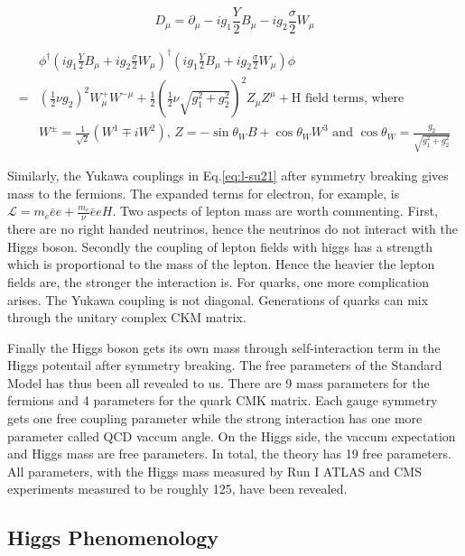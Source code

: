 \begin{equation}
 D_{\mu}  = \partial_{\mu}-ig_1\frac{Y}{2}B_{\mu} - ig_2\frac{\sigma}{2}W_{\mu}
  \label{eq:SU2U1D}
\end{equation}


\begin{equation}
  \begin{split}
   &\phi^{\dagger}(ig_1\frac{Y}{2}B_{\mu}+ig_2\frac{\sigma}{2}W_{\mu})^{\dagger} (ig_1\frac{Y}{2}B_{\mu}+ig_2\frac{\sigma}{2}W_{\mu}) \phi  \\
   =& (\frac{1}{2}\nu g_2)^2 W_{\mu}^+W^{-\mu} + \frac{1}{2}(\frac{1}{2}\nu \sqrt{g_1^2+g_2^2})^2 Z_{\mu}Z^{\mu} + \text{H field terms, where}\\
   &W^{\pm} = \frac{1}{\sqrt{2}}(W^1\mp iW^2) \text{, } Z = -\sin{\theta_W}B+\cos{\theta_W}W^3 \text{ and } \cos{\theta_W} = \frac{g_2}{\sqrt{g^2_1+g^2_2}}
  \end{split}
  \label{eq:SU2U1cov}
\end{equation}


Similarly, the Yukawa couplings in Eq.\ref{eq:l-su21} after symmetry breaking gives mass to the fermions. The expanded terms for electron, for example, is $\mathcal{L} = m_e\bar{e} e + \frac{m_{e}}{\nu}\bar{e}e H$. Two aspects of lepton mass are worth commenting. First, there are no right handed neutrinos, hence the neutrinos do not interact with the Higgs boson. Secondly the coupling of lepton fields with higgs has a strength which is proportional to the mass of the lepton. Hence the heavier the lepton fields are, the stronger the interaction is. For quarks, one more complication arises. The Yukawa coupling is not diagonal. Generations of quarks can mix through the unitary complex CKM matrix.

Finally the Higgs boson gets its own mass through self-interaction term in the Higgs potentail after symmetry breaking. The free parameters of the Standard Model has thus been all revealed to us. There are 9 mass parameters for the fermions and 4 parameters for the quark CMK matrix. Each gauge symmetry gets one free coupling parameter while the strong interaction has one more parameter called QCD vaccum angle. On the Higgs side, the vaccum expectation and Higgs mass are free parameters. In total, the theory has 19 free parameters. All parameters, with the Higgs mass measured by Run I ATLAS and CMS experiments measured to be roughly 125, have been revealed. 


\subsection{Higgs Phenomenology}


